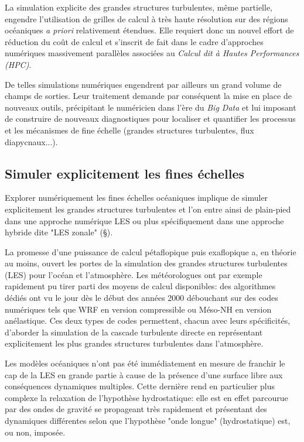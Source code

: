 La simulation explicite des grandes structures turbulentes, même partielle, engendre l'utilisation de grilles de calcul à très haute résolution sur des régions océaniques \textit{a priori} relativement étendues. Elle requiert donc un nouvel effort de réduction du coût de calcul et s'inscrit de fait dans le cadre d'approches numériques massivement parallèles associées au \textit{Calcul dit à Hautes Performances (HPC)}.

De telles simulations numériques engendrent par ailleurs un grand volume de champs de sorties. Leur traitement demande par conséquent la mise en place de nouveaux outils, précipitant le numéricien dans l'ère du \textit{Big Data} et lui imposant de construire de nouveaux diagnostiques pour localiser et quantifier les processus et les mécanismes de fine échelle (grandes structures turbulentes, flux diapycnaux...).


\subsection{Simuler explicitement les fines échelles}

Explorer numériquement les fines échelles océaniques implique de simuler explicitement les grandes structures turbulentes et l'on entre ainsi de plain-pied dans une approche numérique LES ou plus spécifiquement dans une approche hybride dite "LES zonale" (\S {}).

La promesse d’une puissance de calcul pétaflopique puis exaflopique a, en théorie au moins, ouvert les portes de la simulation des grandes structures turbulentes (LES) pour l’océan et l’atmosphère. Les météorologues ont par exemple rapidement pu tirer parti des moyens de calcul disponibles: des algorithmes dédiés ont vu le jour dès le début des années 2000 débouchant sur des codes numériques tels que WRF \citep{skamarock_prototypes_2001} en version compressible ou Méso-NH \citep{lac_overview_2018} en version anélastique. Ces deux types de codes permettent, chacun avec leurs spécificités, d’aborder la simulation de la cascade turbulente directe en représentant explicitement les plus grandes structures turbulentes dans l’atmosphère.

Les modèles océaniques n’ont pas été immédiatement en mesure de franchir le cap de la LES en grande partie à cause de la présence d’une surface libre aux conséquences dynamiques multiples. Cette dernière rend en particulier plus complexe la relaxation de l’hypothèse hydrostatique: elle est en effet parcourue par des ondes de gravité se propageant très rapidement et présentant des dynamiques différentes selon que l'hypothèse "onde longue" (hydrostatique) est, ou non, imposée.

